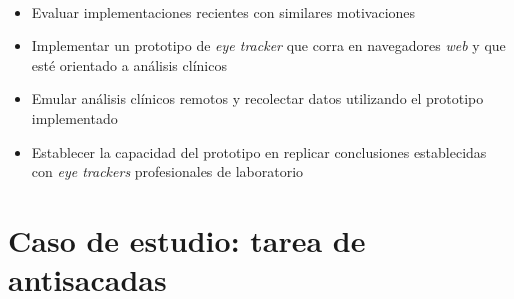 \documentclass[aspectratio=169]{beamer}
\begin{document}
\begin{frame}{~}

  \begin{itemize}
    \item Evaluar implementaciones recientes con similares motivaciones

    \item Implementar un prototipo de \textit{eye tracker} que corra en
      navegadores \textit{web} y que esté orientado a análisis clínicos

    \item Emular análisis clínicos remotos y recolectar datos utilizando el
      prototipo implementado

    \item Establecer la capacidad del prototipo en replicar conclusiones
      establecidas con \textit{eye trackers} profesionales de laboratorio

  \end{itemize}

\end{frame}

\section{Caso de estudio: tarea de antisacadas}
\end{document}
